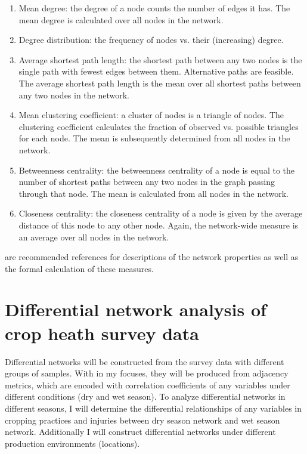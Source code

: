 \begin{enumerate}
\item Mean degree: the degree of a node counts the number of edges it has. The mean degree is calculated over all nodes in the network.
\item Degree distribution: the frequency of nodes vs. their (increasing) degree.
\item Average shortest path length: the shortest path between any two nodes is the single path with fewest edges between them. Alternative paths are feasible. The average shortest path length is the mean over all shortest paths between any two nodes in the network.
\item Mean clustering coefficient: a cluster of nodes is a triangle of nodes. The clustering coefficient calculates the fraction of observed vs. possible triangles for each node. The mean is subsequently determined from all nodes in the network.
\item Betweenness centrality: the betweenness centrality of a node is equal to the number of shortest paths between any two nodes in the graph passing through that node. The mean is calculated from all nodes in the network.
\item Closeness centrality: the closeness centrality of a node is given by the average distance of this node to any other node. Again, the network-wide measure is an average over all nodes in the network.
\end{enumerate}

\citet{Deng:2012do, Toubiana:2013cv, horvath2011weighted, newman2003structure} are recommended references for descriptions of the network properties as well as the formal calculation of these measures.

\section*{Differential network analysis of crop heath survey data}


Differential networks will be constructed from the survey data with different groups of samples. With in my focuses, they will be produced from adjacency metrics, which are encoded with correlation coefficients of any variables under different conditions (dry and wet season). To analyze differential networks in different seasons, I will determine the differential relationships of any variables in cropping practices and injuries between dry season network and wet season network. Additionally I will construct differential networks under different production environments (locations).

